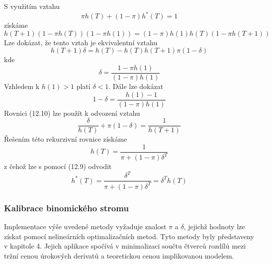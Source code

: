 \documentclass[a4paper]{book}
\begin{document}
S využitím vztahu
\begin{equation*}
\pi h(T) + (1 - \pi)h^{*}(T) = 1
\end{equation*}
získáme
\begin{equation*}
h(T+1)(1 - \pi h(T))(1 - \pi h(1)) = (1 - \pi)h(1)h(T)(1 - \pi h(T+1))
\end{equation*}
Lze dokázat, že tento vztah je ekvivalentní vztahu
\begin{equation}
h(T+1)\delta = h(T) - h(T)h(T+1)\pi(1 - \delta)
\end{equation}
kde
\begin{equation*}
\delta = \frac{1 - \pi h(1)}{(1 - \pi)h(1)}
\end{equation*}
Vzhledem k $h(1) > 1$ platí $\delta < 1$. Dále lze dokázat
\begin{equation*}
1 - \delta = \frac{h(1)-1}{(1-\pi)h(1)}
\end{equation*}
Rovnici (12.10) lze použít k odvození vztahu
\begin{equation*}
\frac{\delta}{h(T)}+\pi(1 - \delta) = \frac{1}{h(T+1)}
\end{equation*}
Řešením této rekurzivní rovnice získáme
\begin{equation*}
h(T) = \frac{1}{\pi + (1-\pi)\delta^T}
\end{equation*}
z čehož lze s pomocí (12.9) odvodit
\begin{equation*}
h^{*}(T) = \frac{\delta^T}{\pi + (1 - \pi)\delta^T} = \delta^T h(T)
\end{equation*}

\subsubsection{Kalibrace binomického stromu}

Implementace výše uvedené metody vyžaduje znalost $\pi$ a $\delta$, jejichž hodnoty lze získat pomocí nelineárních optimalizačních metod. Tyto metody byly představeny v kapitole 4. Jejich aplikace spočívá v minimalizaci součtu čtverců rozdílů mezi tržní cenou úrokových derivatů a teoretickou cenou implikovanou modelem.\\
\end{document}

